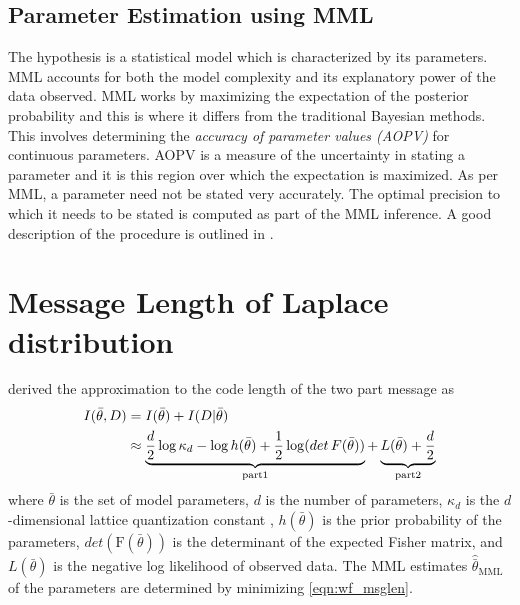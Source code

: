 \documentclass[wcp]{jmlr}
\begin{document}
\subsection{Parameter Estimation using MML}
The hypothesis is a statistical model which is characterized by its parameters.
MML accounts for both the model complexity and its explanatory power of the 
data observed. MML works by maximizing the expectation of the posterior
probability and this is where it differs from the traditional Bayesian methods.
This involves determining the \emph{accuracy of parameter values (AOPV)} for
continuous parameters. AOPV is a measure of the uncertainty in stating a
parameter and it is this region over which the expectation is maximized. As per
MML, a parameter need not be stated very accurately. The optimal precision to which
it needs to be stated is computed as part of the MML inference. A good
description of the procedure is outlined in \citet{oliver1994mml}. 

\section{Message Length of Laplace distribution}
\citet{wallace-87} derived the approximation to the code length of the two part message as
\begin{align}
I(\bar{\theta},D) &= I(\bar{\theta}) + I(D|\bar{\theta}) \notag\\
&\approx \underbrace{\frac{d}{2}\log\kappa_d -\log h(\bar{\theta}) + \frac{1}{2}\log(det\,F(\bar{\theta}))}_{\mathrm{part 1}} + \underbrace{L(\bar{\theta}) + \frac{d}{2}}_{\mathrm{part 2}} \label{eqn:wf_msglen}
\end{align}
where $\bar{\theta}$ is the set of model parameters, $d$ is the number of parameters, 
$\kappa_d$ is the $d$-dimensional lattice quantization constant \citep{conwaySloane84}, 
$h(\bar{\theta})$ is the prior probability of the parameters, 
$det(\mathrm{F}(\bar{\theta}))$ is the determinant of the expected Fisher matrix, and
$L(\bar{\theta})$ is the negative log likelihood of observed data. The MML estimates 
$\hat{\bar{\theta}}_{\mathrm{MML}}$ of the parameters are determined by minimizing 
\eqref{eqn:wf_msglen}. 
\end{document}
